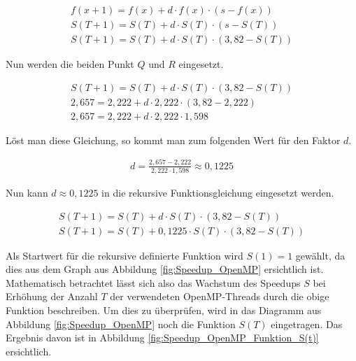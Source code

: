 \begin{description}
						\begin{align*}
							f(x + 1) = f(x) + d \cdot f(x) \cdot (s - f(x))\\
							S(T + 1) = S(T) + d \cdot S(T) \cdot (s - S(T))\\
							S(T + 1) = S(T) + d \cdot S(T) \cdot (3,82 - S(T))
						\end{align*}
						
						Nun werden die beiden Punkt $Q$ und $R$ eingesetzt.
						
						\begin{align*}
							S(T + 1) = S(T) + d \cdot S(T) \cdot (3,82 - S(T))\\
							2,657 = 2,222 + d \cdot 2,222 \cdot (3,82 - 2,222)\\
							2,657 = 2,222 + d \cdot 2,222 \cdot 1,598
						\end{align*}
						
						Löst man diese Gleichung, so kommt man zum folgenden Wert für den Faktor $d$.
						
						\begin{align*}
							d = \frac{2,657 - 2,222}{2,222 \cdot 1,598} \approx 0,1225
						\end{align*}
						
						Nun kann $d\approx 0,1225$ in die rekursive Funktionsgleichung eingesetzt werden.
						
						\begin{align*}
							S(T + 1) = S(T) + d \cdot S(T) \cdot (3,82 - S(T))\\
							S(T + 1) = S(T) + 0,1225 \cdot S(T) \cdot (3,82 - S(T))
						\end{align*}
						
						Als Startwert für die rekursive definierte Funktion wird $S(1) = 1$ gewählt, da dies aus dem Graph aus Abbildung \ref{fig:Speedup_OpenMP} ersichtlich ist.\\						
						Mathematisch betrachtet lässt sich also das Wachstum des Speedups $S$ bei Erhöhung der Anzahl $T$ der verwendeten OpenMP-Threads durch die obige Funktion beschreiben. Um dies zu überprüfen, wird in das Diagramm aus Abbildung \ref{fig:Speedup_OpenMP} noch die Funktion $S(T)$ eingetragen. Das Ergebnis davon ist in Abbildung \ref{fig:Speedup_OpenMP_Funktion_S(t)} ersichtlich.
					

\end{description}
